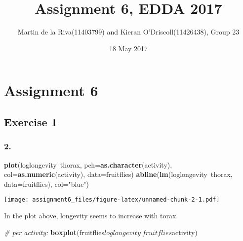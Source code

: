 \documentclass[11pt,]{article}
\title{Assignment 6, EDDA 2017}
\author{Martin de la Riva(11403799) and Kieran O'Driscoll(11426438), Group 23}
\date{18 May 2017}
\newenvironment{Shaded}{\begin{snugshade}}{\end{snugshade}}
\newcommand{\KeywordTok}[1]{\textcolor[rgb]{0.13,0.29,0.53}{\textbf{{#1}}}}
\newcommand{\DataTypeTok}[1]{\textcolor[rgb]{0.13,0.29,0.53}{{#1}}}
\newcommand{\StringTok}[1]{\textcolor[rgb]{0.31,0.60,0.02}{{#1}}}
\newcommand{\CommentTok}[1]{\textcolor[rgb]{0.56,0.35,0.01}{\textit{{#1}}}}
\newcommand{\OtherTok}[1]{\textcolor[rgb]{0.56,0.35,0.01}{{#1}}}
\newcommand{\NormalTok}[1]{{#1}}
\begin{document}
\maketitle

\section{Assignment 6}\label{assignment-6}

\subsection{Exercise 1}\label{exercise-1}

\begin{Shaded}
\end{Shaded}

\subsubsection{2.}\label{section}

\begin{Shaded}
\begin{Highlighting}[]
\KeywordTok{plot}\NormalTok{(loglongevity~thorax, }\DataTypeTok{pch=}\KeywordTok{as.character}\NormalTok{(activity), }\DataTypeTok{col=}\KeywordTok{as.numeric}\NormalTok{(activity), }\DataTypeTok{data=}\NormalTok{fruitflies)}
\KeywordTok{abline}\NormalTok{(}\KeywordTok{lm}\NormalTok{(loglongevity~thorax, }\DataTypeTok{data=}\NormalTok{fruitflies), }\DataTypeTok{col=}\StringTok{"blue"}\NormalTok{)}
\end{Highlighting}
\end{Shaded}

\texttt{[image: assignment6\_files/figure-latex/unnamed-chunk-2-1.pdf]}

In the plot above, longevity seems to increase with torax.

\begin{Shaded}
\begin{Highlighting}[]
\CommentTok{# per activity:}
\KeywordTok{boxplot}\NormalTok{(fruitflies$loglongevity~fruitflies$activity)}
\end{Highlighting}
\end{Shaded}
\end{document}

